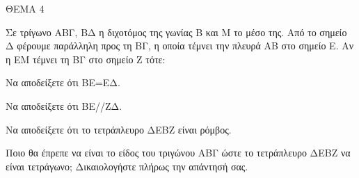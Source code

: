 
ΘΕΜΑ 4

Σε τρίγωνο ΑΒΓ, ΒΔ η διχοτόμος της γωνίας Β και Μ το μέσο της. Από το σημείο Δ φέρουμε παράλληλη προς τη ΒΓ, η οποία τέμνει την πλευρά ΑΒ στο σημείο Ε. Αν η ΕΜ τέμνει τη ΒΓ στο σημείο Ζ τότε:

\begin{alist}
\item Να αποδείξετε ότι ΒΕ=ΕΔ. 

\item Να αποδείξετε ότι ΒΕ//ΖΔ. 

\item Να αποδείξετε ότι το τετράπλευρο ΔΕΒΖ είναι ρόμβος. 

\item Ποιο θα έπρεπε να είναι το είδος του τριγώνου ΑΒΓ ώστε το τετράπλευρο ΔΕΒΖ να είναι τετράγωνο; Δικαιολογήστε πλήρως την απάντησή σας. 
\end{alist}
